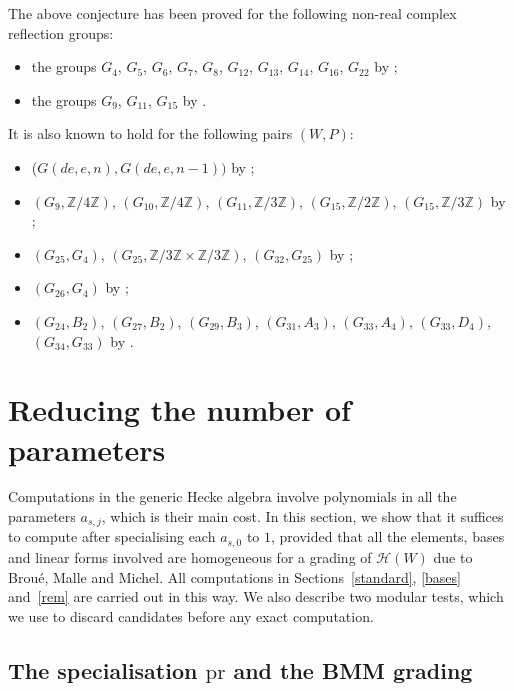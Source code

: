 \documentclass[11pt, reqno]{amsart}
\numberwithin{equation}{section}
\theoremstyle{remark}
\begin{document}
	The above conjecture has been proved for the following non-real complex reflection groups:
	\begin{itemize}
		\item the groups  $G_4$,  $G_5$, $G_6$, $G_7$, $G_8$,  $G_{12}$, $G_{13}$, $G_{14}$, $G_{16}$, $G_{22}$ by \cite{ChCh}; \smallbreak
		\item the groups $G_9$, $G_{11}$,  $G_{15}$ by \cite{Ch26}.
	\end{itemize}	
	It is also known to hold for the following pairs $(W,P)$:
	\begin{itemize}
		\item  ($G(de,e,n), G(de,e,n-1))$ by   \cite{Sch}; \smallbreak
		\item $(G_9, \mathbb{Z}/4\mathbb{Z})$, $(G_{10},\mathbb{Z}/4\mathbb{Z})$, $(G_{11},\mathbb{Z}/3\mathbb{Z})$, 
		$(G_{15}, \mathbb{Z}/2\mathbb{Z})$, $(G_{15}, \mathbb{Z}/3\mathbb{Z})$ by  \cite{ChCh};\smallbreak
		\item $(G_{25},G_4)$, $(G_{25},\mathbb{Z}/3\mathbb{Z}\times \mathbb{Z}/3\mathbb{Z})$, 
		$(G_{32},G_{25})$ 
		by  \cite{Mar41};\smallbreak
		\item $(G_{26},{G_4})$ 	by  \cite{Mar43};\smallbreak	
		\item $(G_{24}, B_2)$, $(G_{27},B_2)$, $(G_{29},B_3)$, $(G_{31}, A_3)$, $(G_{33}, A_4)$, $(G_{33},D_4)$, $(G_{34},G_{33})$ by  \cite{MaPf}.	
	\end{itemize}
	
	

	
	\section{Reducing the number of parameters}\label{sec:reduce}

Computations in the generic Hecke algebra involve polynomials in all
the parameters $a_{s,j}$, which is their main cost. In this section, we
show that it suffices to compute after specialising each $a_{s,0}$ to
$1$, provided that all the elements, bases and linear forms involved
are homogeneous for a grading of $\mathcal H(W)$ due to Brou\'e, Malle
and Michel. All computations in Sections~\ref{standard}, \ref{bases} and~\ref{rem} are carried out in
this way. We also describe two modular tests, which we use to discard
candidates before any exact computation.
	
	\subsection{The specialisation $\mathrm{pr}$ and the BMM grading}\label{sec-pr}
	
\end{document}
